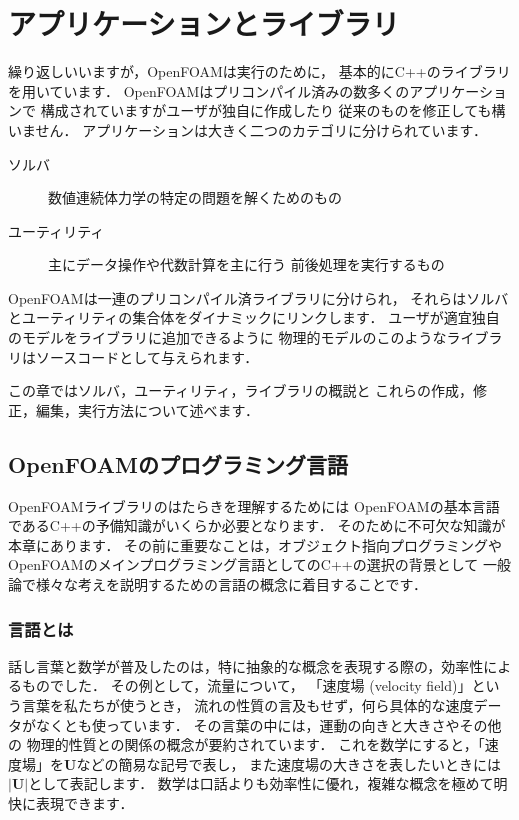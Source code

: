 \chapter{アプリケーションとライブラリ}
\label{chap:3}
%
%
%
%
繰り返しいいますが，OpenFOAMは実行のために，
基本的にC++のライブラリを用いています．
OpenFOAMはプリコンパイル済みの数多くのアプリケーションで
構成されていますがユーザが独自に作成したり
従来のものを修正しても構いません．
アプリケーションは大きく二つのカテゴリに分けられています．
\begin{description}
 \item[ソルバ] 数値連続体力学の特定の問題を解くためのもの
 \item[ユーティリティ] 主にデータ操作や代数計算を主に行う
            前後処理を実行するもの
\end{description}
OpenFOAMは一連のプリコンパイル済ライブラリに分けられ，
それらはソルバとユーティリティの集合体をダイナミックにリンクします．
ユーザが適宜独自のモデルをライブラリに追加できるように
物理的モデルのこのようなライブラリはソースコードとして与えられます．

この章ではソルバ，ユーティリティ，ライブラリの概説と
これらの作成，修正，編集，実行方法について述べます．



\section{OpenFOAMのプログラミング言語}
\label{sec:3.1}
OpenFOAMライブラリのはたらきを理解するためには
OpenFOAMの基本言語であるC++の予備知識がいくらか必要となります．
そのために不可欠な知識が本章にあります．
その前に重要なことは，オブジェクト指向プログラミングや
OpenFOAMのメインプログラミング言語としてのC++の選択の背景として
一般論で様々な考えを説明するための言語の概念に着目することです．


\subsection{言語とは}
\label{ssec:3.1.1}
話し言葉と数学が普及したのは，特に抽象的な概念を表現する際の，効率性によるものでした．
その例として，流量について，
「速度場 (velocity field)」という言葉を私たちが使うとき，
流れの性質の言及もせず，何ら具体的な速度データがなくとも使っています．
その言葉の中には，運動の向きと大きさやその他の
物理的性質との関係の概念が要約されています．
これを数学にすると，「速度場」を$\bm{U}$などの簡易な記号で表し，
また速度場の大きさを表したいときには$|\bm{U}|$として表記します．
数学は口話よりも効率性に優れ，複雑な概念を極めて明快に表現できます．


